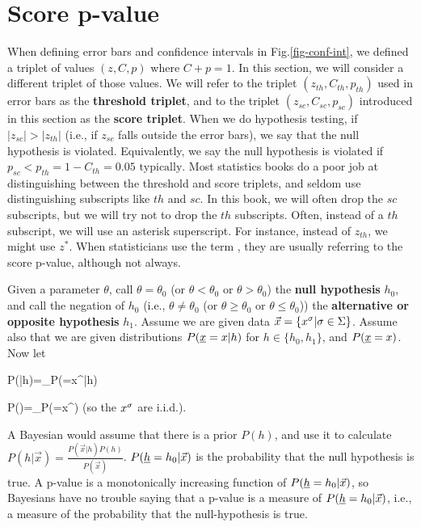 \section{Score p-value}
\label{sec-score-p-value}
When defining error bars
and confidence intervals in 
Fig.\ref{fig-conf-int},
we defined a triplet 
of values $(z, C, p)$
where $C+p=1$.
In this section,
we will consider a different triplet
of those values.
We will refer to the triplet
$(z_{th}, C_{th}, p_{th})$
used in error bars as the {\bf threshold triplet}, and to
the triplet 
$(z_{sc}, C_{sc}, p_{sc})$
introduced in this section as the
{\bf score triplet}.
When we do hypothesis testing,
if $|z_{sc}|> |z_{th}|$
(i.e., if $z_{sc}$
falls outside
the error bars),
we say that the null
hypothesis is violated.
Equivalently, we say the null
hypothesis is violated
if $p_{sc}<p_{th}=1-C_{th}=0.05 \text{ typically}$. 
Most statistics 
books do a poor job 
at distinguishing between
the threshold and score
triplets, and 
seldom use distinguishing
subscripts like $th$ and $sc$.
In this book,
we will often
drop the $sc$
subscripts, but we will
try not to drop the $th$ subscripts.
Often, instead of
a $th$
subscript, we will
use an asterisk superscript.
For instance, instead
of $z_{th}$,
we might use $z^*$.
W\label{key}hen statisticians 
use the term
,
they are usually referring to
the score p-value,
although not always.



Given a parameter $\theta$, call
$\theta=\theta_0$ (or  $\theta<\theta_0$ or $\theta>\theta_0$) the
{\bf null hypothesis} $h_0$,
and call the negation of $h_0$ (i.e., 
$\theta\neq\theta_0$ (or  $\theta\geq\theta_0$ or $\theta\leq \theta_0$))
the {\bf alternative or
opposite hypothesis} $h_1$.
Assume we
are given data $\vec{x}=\{x^\sigma|\sigma\in \Sigma\}$. Assume
also that we are given
distributions $P(\rvx=x|h)$ for $h\in \{h_0, h_1\}$,
and $P(\rvx=x)$. Now let

\beq
P(|h)=\prod_\s P(\rvx=x^\s|h)
\eeq


\beq
P()=\prod_\s P(\rvx=x^\s)
\eeq
(so the $x^\sigma$ are i.i.d.).

A Bayesian would assume that there
is a prior $P(h)$, and use it to
calculate
$P(h|\vec{x})=\frac{P(\vec{x}|h) P(h)}{P(\vec{x})}$.
$P(\rvh= h_0|\vec{x})$
is the probability that the null hypothesis is true.
A p-value is a monotonically increasing function of
$P(\rvh= h_0|\vec{x})$,
so Bayesians have no trouble saying
that  {\color{red} a  p-value is
a measure of
$P(\rvh= h_0|\vec{x})$, i.e.,
a measure of the probability that
the null-hypothesis is true}.


